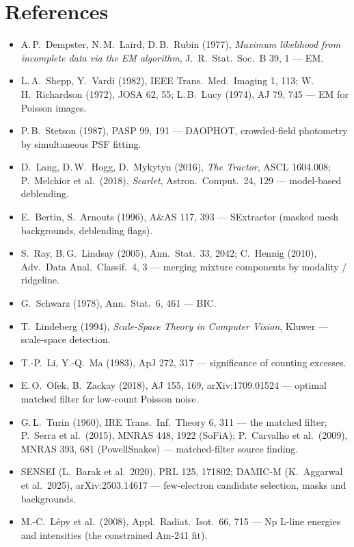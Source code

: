 \documentclass[11pt,a4paper]{article}
\begin{document}
\section*{References}
\begin{itemize}\small\itemsep1pt
\item A.\,P.\ Dempster, N.\,M.\ Laird, D.\,B.\ Rubin (1977), \emph{Maximum likelihood from incomplete data via the EM algorithm},
J.\ R.\ Stat.\ Soc.\ B 39, 1 --- EM.
\item L.\,A.\ Shepp, Y.\ Vardi (1982), IEEE Trans.\ Med.\ Imaging 1, 113; W.\,H.\ Richardson (1972), JOSA 62, 55; L.\,B.\ Lucy
(1974), AJ 79, 745 --- EM for Poisson images.
\item P.\,B.\ Stetson (1987), PASP 99, 191 --- DAOPHOT, crowded-field photometry by simultaneous PSF fitting.
\item D.\ Lang, D.\,W.\ Hogg, D.\ Mykytyn (2016), \emph{The Tractor}, ASCL 1604.008; P.\ Melchior et al.\ (2018),
\emph{Scarlet}, Astron.\ Comput.\ 24, 129 --- model-based deblending.
\item E.\ Bertin, S.\ Arnouts (1996), A\&AS 117, 393 --- SExtractor (masked mesh backgrounds, deblending flags).
\item S.\ Ray, B.\,G.\ Lindsay (2005), Ann.\ Stat.\ 33, 2042; C.\ Hennig (2010), Adv.\ Data Anal.\ Classif.\ 4, 3 --- merging
mixture components by modality / ridgeline.
\item G.\ Schwarz (1978), Ann.\ Stat.\ 6, 461 --- BIC.
\item T.\ Lindeberg (1994), \emph{Scale-Space Theory in Computer Vision}, Kluwer --- scale-space detection.
\item T.-P.\ Li, Y.-Q.\ Ma (1983), ApJ 272, 317 --- significance of counting excesses.
\item E.\,O.\ Ofek, B.\ Zackay (2018), AJ 155, 169, arXiv:1709.01524 --- optimal matched filter for low-count Poisson noise.
\item G.\,L.\ Turin (1960), IRE Trans.\ Inf.\ Theory 6, 311 --- the matched filter; P.\ Serra et al.\ (2015), MNRAS 448, 1922
(SoFiA); P.\ Carvalho et al.\ (2009), MNRAS 393, 681 (PowellSnakes) --- matched-filter source finding.
\item SENSEI (L.\ Barak et al.\ 2020), PRL 125, 171802; DAMIC-M (K.\ Aggarwal et al.\ 2025), arXiv:2503.14617 --- few-electron
candidate selection, masks and backgrounds.
\item M.-C.\ L\'epy et al.\ (2008), Appl.\ Radiat.\ Isot.\ 66, 715 --- Np L-line energies and intensities (the constrained
Am-241 fit).
\end{itemize}
\end{document}
